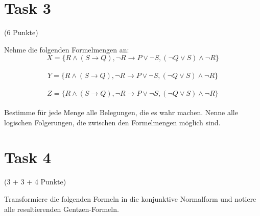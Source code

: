 \documentclass{exam}
\newcommand{\Punkte}[1]{\begin{flushright}(#1 Punkte)\end{flushright}}
\begin{document}
	\clearpage
	\section{Task 3}
		
	\Punkte{6}
	
	Nehme die folgenden Formelmengen an:\\
	$$ X = \{ R \land (S \rightarrow Q), \lnot R \rightarrow P \lor \lnot S, (\lnot Q \lor S) \land \lnot R \} $$\\
	$$ Y = \{ R \land (S \rightarrow Q), \lnot R \rightarrow P \lor \lnot S, (\lnot Q \lor S) \land \lnot R \} $$\\
	$$ Z = \{ R \land (S \rightarrow Q), \lnot R \rightarrow P \lor \lnot S, (\lnot Q \lor S) \land \lnot R \} $$\\
	Bestimme für jede Menge alle Belegungen, die es wahr machen. Nenne alle logischen Folgerungen, die zwischen den Formelmengen möglich sind.
	
	\clearpage
	\section{Task 4}
	
	\Punkte{3 + 3 + 4}
	
	Transformiere die folgenden Formeln in die konjunktive Normalform und notiere alle resultierenden Gentzen-Formeln.\\
	
	
	
	
\end{document}
